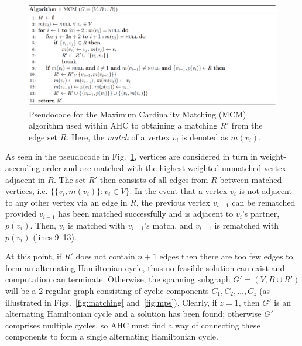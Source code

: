 \documentclass[authoryear]{elsarticle}
\begin{document}
\begin{figure}[h!]	
	\centering
	\includegraphics[width=\textwidth]{figures/AlgMCM}
	\caption{Pseudocode for the Maximum Cardinality Matching (MCM) algorithm used within AHC to obtaining a matching $R'$ from the edge set $R$. Here, the \emph{match} of a vertex $v_i$ is denoted as $m(v_i)$.}	
	\label{fig:algmcm}
\end{figure}

\noindent As seen in the pseudocode in Fig.~\ref{fig:algmcm}, vertices are considered in turn in weight-ascending order and are matched with the highest-weighted unmatched vertex adjacent in $R$. The set $R'$ then consists of all edges from $R$ between matched vertices, i.e. $\{\{v_i, m(v_i)\} : v_i \in V \}$. In the event that a vertex $v_i$ is not adjacent to any other vertex via an edge in $R$, the previous vertex $v_{i-1}$ can be rematched provided $v_{i-1}$ has been matched successfully and is adjacent to $v_i$'s partner, $p(v_i)$. Then, $v_i$ is matched with $v_{i-1}$'s match, and $v_{i-1}$ is rematched with $p(v_i)$ (lines 9--13).

At this point, if $R'$ does not contain $n+1$ edges then there are too few edges to form an alternating Hamiltonian cycle, thus no feasible solution can exist and computation can terminate. Otherwise, the spanning subgraph $G'=(V, B \cup R')$ will be a 2-regular graph consisting of cyclic components $C_1,C_2,\dotsc,C_z$ (as illustrated in Figs.~\ref{fig:matching} and~\ref{fig:mps}). Clearly, if $z = 1$, then $G'$ is an alternating Hamiltonian cycle and a solution has been found; otherwise $G'$ comprises multiple cycles, so AHC must find a way of connecting these components to form a single alternating Hamiltonian cycle.
\end{document}
